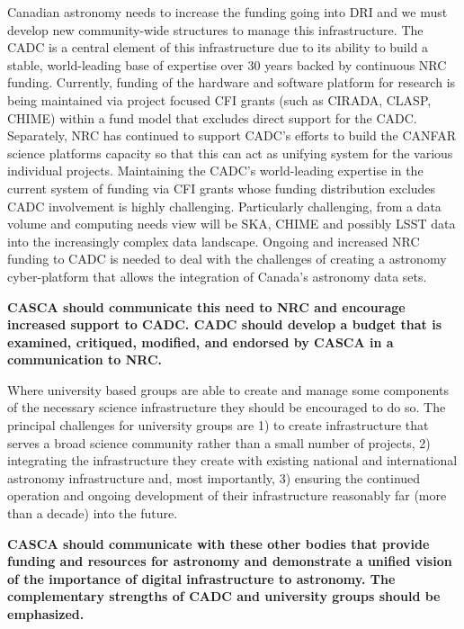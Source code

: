 \documentclass[11pt]{article}
\begin{document}
Canadian astronomy needs to increase the funding going into DRI and we must develop new community-wide structures to manage this infrastructure. The CADC is a central element of this infrastructure due to its ability to build a stable, world-leading base of expertise over 30 years backed by continuous NRC funding. 
Currently, funding of the hardware and software platform for research is being maintained via project focused CFI grants (such as CIRADA, CLASP, CHIME) within a fund model that excludes direct support for the CADC.  Separately, NRC has continued to support CADC's efforts to build the CANFAR science platforms capacity so that this can act as unifying system for the various individual projects.
Maintaining the CADC's world-leading expertise in the current system of funding via CFI grants whose funding distribution excludes CADC involvement is highly challenging.   Particularly challenging, from a data volume and computing needs view will be SKA, CHIME and possibly LSST data into the increasingly complex data landscape. 
Ongoing and increased NRC funding to CADC is needed to deal with the challenges of creating a astronomy cyber-platform that allows the integration of Canada's astronomy data sets. 

{\bf CASCA should communicate this need to NRC and encourage increased support to CADC. CADC should develop a budget that is examined, critiqued, modified, and endorsed by CASCA in a communication to NRC.}

Where university based groups are able to create and manage some components of the necessary science infrastructure they should be encouraged to do so. The principal challenges for university groups are 1) to create infrastructure that serves a broad science community rather than a small number of projects, 2) integrating the infrastructure they create with existing national and international astronomy infrastructure and, most importantly, 3) ensuring the continued operation and ongoing development of their infrastructure reasonably far (more than a decade) into the future.

{\bf CASCA should communicate with these other bodies that provide funding and resources for astronomy and demonstrate a unified vision of the importance of digital infrastructure to astronomy. The complementary strengths of CADC and university groups should be emphasized.}
\end{document}
